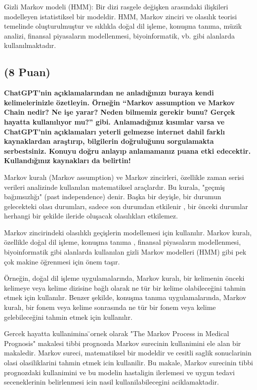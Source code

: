 \documentclass[11pt]{article}
\begin{document}
Gizli Markov modeli (HMM): Bir dizi rasgele değişken arasındaki ilişkileri modelleyen istatistiksel bir modeldir. HMM, Markov zinciri ve olasılık teorisi temelinde oluşturulmuştur ve sıklıkla doğal dil işleme, konuşma tanıma, müzik analizi, finansal piyasaların modellenmesi, biyoinformatik, vb. gibi alanlarda kullanılmaktadır.

\subsection{(8 Puan)} \textbf{ChatGPT’nin açıklamalarından ne anladığınızı buraya kendi kelimelerinizle özetleyin. Örneğin ``Markov assumption ve Markov Chain nedir? Ne işe yarar? Neden bilmemiz gerekir bunu? Gerçek hayatta kullanılıyor mu?'' gibi. Anlamadığınız kısımlar varsa ve ChatGPT’nin açıklamaları yeterli gelmezse internet dahil farklı kaynaklardan araştırıp, bilgilerin doğruluğunu sorgulamakta serbestsiniz. Konuyu doğru anlayıp anlamamanız puana etki edecektir. Kullandığınız kaynakları da belirtin!}

 Markov kuralı (Markov assumption) ve Markov zincirleri, özellikle zaman serisi verileri analizinde kullanılan matematiksel araçlardır. Bu kurala, "geçmiş bağımsızlığı" (past independence) denir. Başka bir deyişle, bir durumun gelecekteki olası durumları, sadece son durumdan etkilenir , bir önceki durumlar herhangi bir şekilde ileride oluşacak olasılıkları etkilemez.

 Markov zincirindeki olasılıklı geçişlerin modellemesi için kullanılır. Markov kuralı, özellikle doğal dil işleme, konuşma tanıma , finansal piyasaların modellenmesi, biyoinformatik gibi alanlarda kullanılan gizli Markov modelleri (HMM) gibi pek çok makine öğrenmesi için önem taşır.

 Örneğin, doğal dil işleme uygulamalarında, Markov kuralı, bir kelimenin önceki kelimeye veya kelime dizisine bağlı olarak ne tür bir kelime olabileceğini tahmin etmek için kullanılır. Benzer şekilde, konuşma tanıma uygulamalarında, Markov kuralı, bir fonem veya kelime sonrasında ne tür bir fonem veya kelime gelebileceğini tahmin etmek için kullanılır.
 
 Gercek hayatta kullanimina ̈ornek olarak "The Markov Process in Medical Prognosis" makalesi tibbi prognozda Markov surecinin kullanimini ele alan bir makaledir. Markov sureci, matematiksel bir modeldir ve cesitli saglik sonuclarinin olasi olasiliklarini tahmin etmek icin kullanilir. Bu makale, Markov surecinin tibbi prognozdaki kullanimini ve bu modelin hastaligin ilerlemesi ve uygun tedavi seceneklerinin belirlenmesi icin nasil kullanilabilecegini aciklamaktadir.
\end{document}
